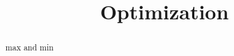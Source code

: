 \documentclass{ximera}
\title{Optimization}
\begin{document}
\begin{abstract}
max and min
\end{abstract}
\maketitle
\end{document}
